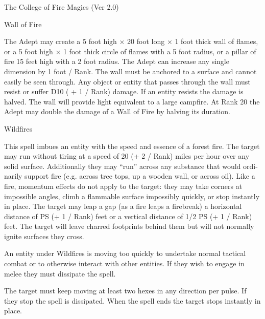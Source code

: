 \begin{Chapter}{The College of Fire Magics (Ver 2.0)}
\begin{spell}[S-13]{Wall of Fire}


\begin{effects}
The Adept may create a 5 foot high × 20 foot long × 1 foot thick wall
of flames, or a 5 foot high × 1 foot thick circle of flames with a 5
foot radius, or a pillar of fire 15 feet high with a 2 foot radius.
The Adept can increase any single dimension by 1 foot / Rank.  The
wall must be anchored to a surface and cannot easily be seen
through. Any object or entity that passes through the wall must resist
or suffer D10 ( + 1 / Rank) damage.  If an entity resists the damage
is halved.  The wall will provide light equivalent to a large
campfire.  At Rank 20 the Adept may double the damage of a Wall of
Fire by halving its duration.

\end{effects}
\end{spell}

\begin{spell}[S-14]{Wildfires}

\begin{effects}
This spell imbues an entity with the speed and essence of a forest
fire.  The target may run without tiring at a speed of 20 (+ 2 / Rank)
miles per hour over any solid surface.  Additionally they may “run”
across any substance that would ordi- narily support fire (e.g.
across tree tops, up a wooden wall, or across oil). Like a fire,
momentum effects do not apply to the target: they may take corners at
impossible angles, climb a flammable surface impossibly quickly, or
stop instantly in place. The target may leap a gap (as a fire leaps a
firebreak) a horizontal distance of PS (+ 1 / Rank) feet or a vertical
distance of 1/2 PS (+ 1 / Rank) feet. The target will leave charred
footprints behind them but will not normally ignite surfaces they
cross.

An entity under Wildfires is moving too quickly to undertake normal
tactical combat or to otherwise interact with other entities.  If they
wish to engage in melee they must dissipate the spell.

The target must keep moving at least two hexes in any direction per
pulse.  If they stop the spell is dissipated.  When the spell ends the
target stops instantly in place.


\end{effects}
\end{spell}
\end{Chapter}
